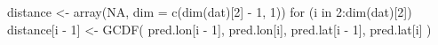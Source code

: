 \begin{Schunk}
\begin{Sinput}
 distance <- array(NA, dim = c(dim(dat)[2] - 1, 1))
 for (i in 2:dim(dat)[2]) {
   distance[i - 1] <- GCDF(
     pred.lon[i - 1], pred.lon[i],
     pred.lat[i - 1], pred.lat[i]
   )
 }
\end{Sinput}
\end{Schunk}
